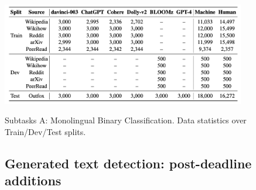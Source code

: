\begin{table}[ht]
    \centering
    \includegraphics[width=0.8\textwidth]{assets/subtaska-data.png}
    \caption{Subtasks A: Monolingual Binary Classification. Data statistics over Train/Dev/Test splits.}
    \label{table:adata}
\end{table}


\subsection{Generated text detection: post-deadline additions}